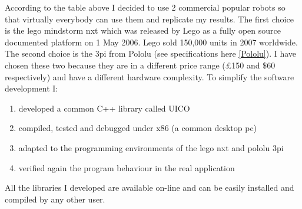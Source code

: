 According to the table above I decided to use 2 commercial popular robots so that virtually everybody can use them and replicate my results. The first choice is the lego mindstorm nxt which was released by Lego as a fully open source documented platform on 1 May 2006. Lego  sold 150,000 units in 2007 worldwide. The second choice is the 3pi from Pololu (see specifications here \ref{Pololu}).
I have chosen these two because they are in a different price range (£150 and $\$60$ respectively) and have a different hardware complexity.
To simplify the software development I:
\begin{enumerate}
 \item developed a common C++ library called UICO
 \item compiled, tested and debugged under x86 (a common desktop pc)
 \item adapted to the programming environments of the lego nxt and pololu 3pi
 \item verified again the program behaviour in the real application
\end{enumerate}

All the libraries I developed are available on-line and can be easily installed and compiled by any other user.


